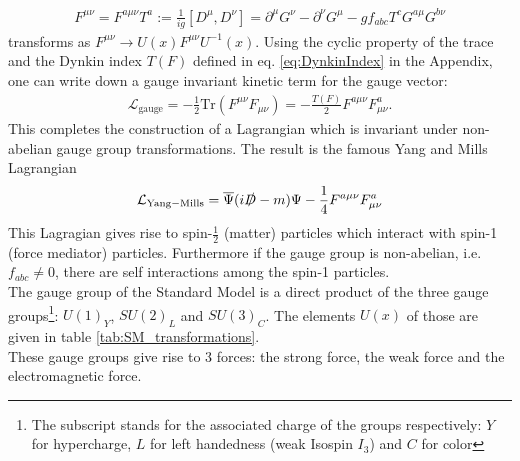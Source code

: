 \begin{align}
F^{\mu\nu} = F^{a\mu\nu}T^a := \frac{1}{ig}[D^\mu,D^\nu] = \partial^\mu G^\nu - \partial^\nu G^\mu - g f_{abc} T^c G^{a\mu}G^{b\nu}
\end{align}
transforms as $F^{\mu\nu} \to U(x)F^{\mu\nu}U^{-1}(x)$. Using the cyclic property of the trace and the Dynkin index $T(F)$ defined in eq. \eqref{eq:DynkinIndex} in the Appendix, one can write down a gauge invariant kinetic term for the gauge vector:
\begin{align}
\mathcal{L}_{\mathrm{gauge}} = - \frac{1}{2} \mathrm{Tr} \left( F^{\mu\nu}F_{\mu\nu} \right) = -\frac{T(F)}{2} F^{a\mu\nu}F^a_{\mu\nu}.
\end{align}
This completes the construction of a Lagrangian which is invariant under non-abelian gauge group transformations. The result is the famous Yang and Mills Lagrangian \cite{PhysRev.96.191}
\begin{align}
\mathcal{L}_{\mathrm{Yang-Mills}} = \overline{\Psi}(i\slashed{D} - m)\Psi - \frac{1}{4}F^{a\mu\nu}F^a_{\mu\nu}
\end{align}
This Lagragian gives rise to spin-$\frac{1}{2}$ (matter) particles which interact with spin-1 (force mediator) particles. Furthermore if the gauge group is non-abelian, i.e. $f_{abc} \neq 0$, there are self interactions among the spin-1 particles.\\
The gauge group of the Standard Model is a direct product of the three gauge groups\footnote{The subscript stands for the associated charge of the groups respectively: $Y$ for hypercharge, $L$ for left handedness (weak Isospin $I_3$) and $C$ for color}: $U(1)_Y$, $SU(2)_L$ and $SU(3)_C$. The elements $U(x)$ of those are given in table \ref{tab:SM_transformations}.\\
These gauge groups give rise to 3 forces: the strong force, the weak force and the electromagnetic force.
